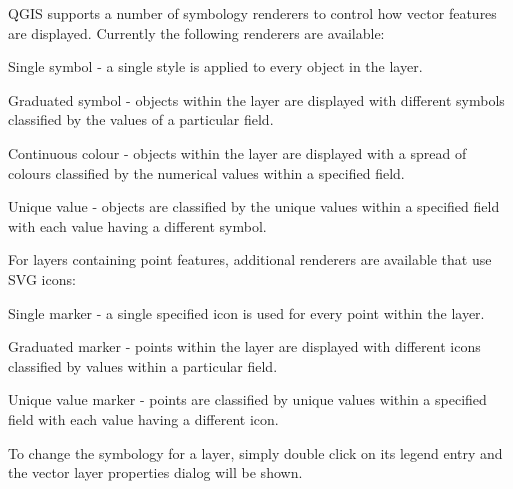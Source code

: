 QGIS supports a number of symbology renderers to control how
vector features are displayed. Currently the following renderers
are available:

\begin{compactdesc}
    \item[Single symbol] - a single style is applied to every
    object in the layer.
    \item[Graduated symbol] - objects within the layer are
    displayed with different symbols classified by the values of a
    particular field.
    \item[Continuous colour] - objects within the layer are
    displayed with a spread of colours classified by the numerical
    values within a specified field.
    \item[Unique value] - objects are classified by the unique
    values within a specified field with each value having a
    different symbol.
\end{compactdesc}

For layers containing point features, additional renderers are
available that use SVG icons:

\begin{compactdesc}
    \item[Single marker] - a single specified icon is used for
    every point within the layer.
    \item[Graduated marker] - points within the layer are
    displayed with different icons classified by values within a
    particular field.
    \item[Unique value marker] - points are classified by unique
    values within a specified field with each value having a
    different icon.
\end{compactdesc}

To change the symbology for a layer, simply double click on its legend entry and
the vector layer properties dialog will be shown.

